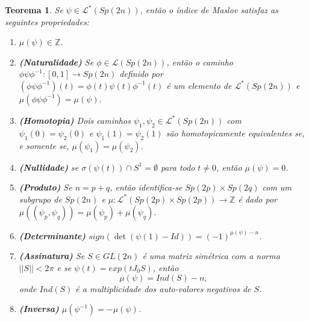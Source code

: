 \documentclass[12pt]{book}
\newtheorem{teorema}{Teorema}[section]
\newcommand{\caminhosespeciais}[1]{\mathcal{L}^{*}(#1)}
\newcommand{\caminhos}{\mathcal{L}}
\newcommand{\caminhossempontobase}[1]{\caminhos(#1)}
\newcommand{\circulo}{S^{1}}
\newcommand{\dominioMaslov}{\caminhos^{*}(\gruposimpletico{2n})}
\newcommand{\espectrooperador}[1]{\sigma(#1)}
\newcommand{\estruturacomplexa}{J_{0}}
\newcommand{\gruposimpletico}[1]{Sp(#1)}
\newcommand{\inteiros}{\mathbb{Z}}
\newcommand{\intervalo}{[0,1]}
\begin{document}
	
	\begin{teorema}\label{teorema_indice_maslov}
		Se $\psi \in \dominioMaslov$, então o índice de Maslov satisfaz as seguintes propriedades:
		\begin{enumerate}
			\item $\mu(\psi) \in \inteiros$.
			
			\item \textbf{(Naturalidade)}\label{item_naturalidade_maslov} Se $\phi\in \caminhossempontobase{\gruposimpletico{2n}}$, então o caminho $\phi\psi\phi^{-1}: \intervalo \to \gruposimpletico{2n}$ definido por $(\phi\psi\phi^{-1})(t) = \phi(t)\psi(t)\phi^{-1}(t)$ é um elemento de $\caminhosespeciais{\gruposimpletico{2n}}$ e $\mu(\phi\psi\phi^{-1}) = \mu(\psi)$.
			
			\item \textbf{(Homotopia)} \label{item_homotopia_caminhos_teorema_indice_maslov} Dois caminhos $\psi_{1}, \psi_{2}\in \dominioMaslov $ com $\psi_{1}(0) = \psi_{2}(0)$ e $\psi_{1}(1) = \psi_{2}(1)$ são homotopicamente equivalentes se, e somente se, $\mu(\psi_{1}) = \mu(\psi_{2})$.
			
			\item \textbf{(Nullidade)} se $\espectrooperador{\psi(t)}\cap \circulo = \emptyset$ para todo $t\neq 0$, então $\mu(\psi) = 0$.
			
			\item \textbf{(Produto)} Se $n=p+q$, então identifica-se $\gruposimpletico{2p}\times \gruposimpletico{2q}$ com um subgrupo de $\gruposimpletico{2n}$ e $\mu:\caminhosespeciais{\gruposimpletico{2p}\times \gruposimpletico{2p}} \to \inteiros$ é dado por $\mu((\psi_{p}, \psi_{q})) = \mu(\psi_{p})+\mu(\psi_{q})$.
			
			\item \textbf{(Determinante)} $sign(\det(\psi(1)-Id)) = (-1)^{\mu(\psi)-n}$.
			
			\item \textbf{(Assinatura)} Se $S \in GL(2n)$ é uma matriz simétrica com a norma $||S|| < 2\pi$ e se $\psi(t) = exp(t\estruturacomplexa S)$, então 
			$$
			\mu(\psi) = Ind(S) - n,
			$$
			onde $Ind(S)$ é a multiplicidade dos auto-valores negativos de $S$.
			
			\item \textbf{(Inversa)} $\mu(\psi^{-1}) = -\mu(\psi)$.
			
		\end{enumerate}
	\end{teorema}
\end{document}
